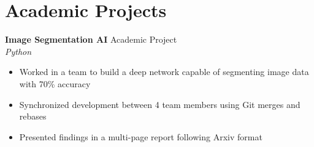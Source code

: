 \documentclass[a4paper,10pt]{article}
\begin{document}
\vspace{1em}

\section*{Academic Projects}
\textbf{Image Segmentation AI} \hfill Academic Project \\
\textit{Python} \\
\begin{itemize}[left=0.15in]
    \item Worked in a team to build a deep network capable of segmenting image data with 70\% accuracy
    \item Synchronized development between 4 team members using Git merges and rebases
    \item Presented findings in a multi-page report following Arxiv format
\end{itemize}
\end{document}
